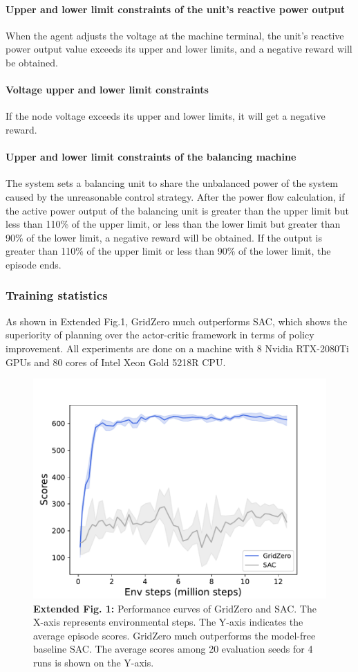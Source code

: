\paragraph{Upper and lower limit constraints of the unit's reactive power output} When the agent adjusts the voltage at the machine terminal, the unit's reactive power output value exceeds its upper and lower limits, and a negative reward will be obtained.
\paragraph{Voltage upper and lower limit constraints} If the node voltage exceeds its upper and lower limits, it will get a negative reward.

\paragraph{Upper and lower limit constraints of the balancing machine} The system sets a balancing unit to share the unbalanced power of the system caused by the unreasonable control strategy. After the power flow calculation, if the active power output of the balancing unit is greater than the upper limit but less than 110\% of the upper limit, or less than the lower limit but greater than 90\% of the lower limit, a negative reward will be obtained. If the output is greater than 110\% of the upper limit or less than 90\% of the lower limit, the episode ends.

\subsubsection*{Training statistics}
As shown in Extended Fig.1, GridZero much outperforms SAC, which shows the superiority of planning over the actor-critic framework in terms of policy improvement. All experiments are done on a machine with 8 Nvidia RTX-2080Ti GPUs and 80 cores of Intel Xeon Gold 5218R CPU.

\begin{figure}[h]
\centering
\includegraphics[width=0.6\linewidth]{fig/performance_curve.pdf}
\captionsetup{labelformat=empty}
\caption{\textbf{Extended Fig. 1:}
Performance curves of GridZero and SAC. The X-axis represents environmental steps. The Y-axis indicates the average episode scores. GridZero much outperforms the model-free baseline SAC. The average scores among 20 evaluation seeds for 4 runs is shown on the Y-axis. }
\label{fig:perf-sns-trade-off}
\end{figure}

